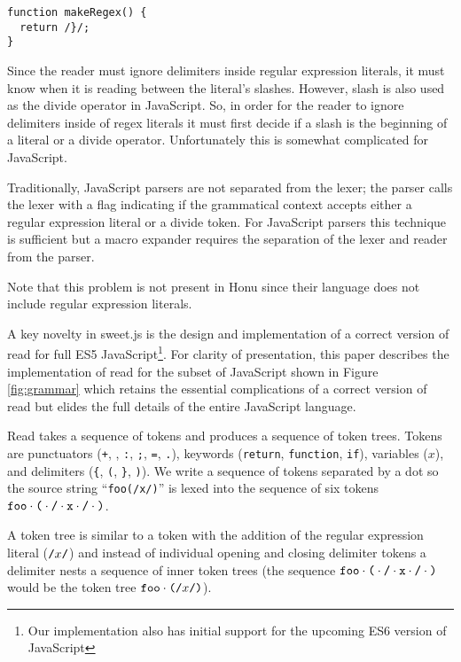 \documentclass[preprint,10pt]{sigplanconf}
\begin{document}
\begin{lstlisting}
function makeRegex() {
  return /}/;
}
\end{lstlisting}

Since the reader must ignore delimiters inside regular expression
literals, it must know when it is reading between the literal's
slashes. However, slash is also used as the divide operator in
JavaScript. So, in order for the reader to ignore delimiters inside of
regex literals it must first decide if a slash is the beginning of a
literal or a divide operator. Unfortunately this is somewhat
complicated for JavaScript.

Traditionally, JavaScript parsers are not separated from the lexer;
the parser calls the lexer with a flag indicating if the grammatical
context accepts either a regular expression literal or a divide token.
For JavaScript parsers this technique is sufficient but a macro
expander requires the separation of the lexer and reader from the
parser.

Note that this problem is not present in Honu since their language
does not include regular expression literals.

A key novelty in sweet.js is the design and implementation of a
correct version of read for full ES5 JavaScript\footnote{Our
  implementation also has initial support for the upcoming ES6
  version of JavaScript}. 
For clarity of presentation, this paper
describes the implementation of read for the subset of JavaScript
shown in Figure \ref{fig:grammar} which retains the essential
complications of a correct version of read but elides the full details
of the entire JavaScript language.

Read takes a sequence of tokens and produces a sequence of token
trees. Tokens are punctuators (\texttt{+}, \div, \texttt{:},
\texttt{;}, \texttt{=}, \texttt{.}), keywords (\texttt{return},
\texttt{function}, \texttt{if}), variables (\( x \)), and delimiters
(\texttt{\{}, \texttt{(}, \texttt{\}}, \texttt{)}). We write a
sequence of tokens separated by a dot so the source string
``\lstinline!foo(/x/)!'' is lexed into the sequence of six tokens
\( \texttt{foo}\cdot \texttt{(} \cdot \texttt{/} \cdot \texttt{x} \cdot \texttt{/} \cdot \texttt{)} \).

A token tree is similar to a token with 
the addition of the regular
expression literal (\( \texttt{/}x\texttt{/} \)) and instead of 
individual opening and
closing delimiter tokens a delimiter nests a sequence of inner token
trees (\eg the sequence \( \texttt{foo} \cdot \texttt{(} \cdot
\texttt{/} \cdot \texttt{x} \cdot \texttt{/} \cdot \texttt{)} \) would be
the token tree \( \texttt{foo} \cdot \texttt{(}\texttt{/}x\texttt{/}\texttt{)} \)).
\end{document}
